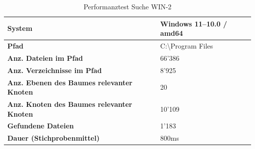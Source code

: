 \documentclass[a4paper,12pt]{report}
\begin{document}
    \begin{table}[h!]
        \centering
        \setlength{\leftmargini}{0.8cm}
        \begin{tabular}{|p{7cm}|p{5cm}|}
            \hline
            \textbf{System}                                            & Windows 11--10.0 / amd64       \\ \hline
            \textbf{Pfad}                                              & C:\textbackslash Program Files \\ \hline
            \textbf{Anz. Dateien im Pfad}                              & 66'386                         \\ \hline
            \textbf{Anz. Verzeichnisse im Pfad}                        & 8'925                          \\ \hline
            \textbf{Anz. Ebenen \newline des Baumes relevanter Knoten} & 20                             \\ \hline
            \textbf{Anz. Knoten \newline des Baumes relevanter Knoten} & 10'109                         \\ \hline
            \textbf{Gefundene Dateien}                                 & 1'183                          \\ \hline
            \textbf{Dauer (Stichprobenmittel)}                        & 800ms                          \\ \hline
        \end{tabular}
        \caption{Performanztest Suche WIN-2}\label{tab:perf-search-win-2}
    \end{table}
\end{document}
